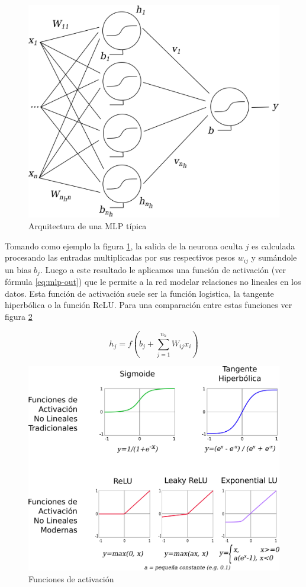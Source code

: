 \begin{figure}[htbp]
	\centering
	\includegraphics[width=0.6\linewidth]{graficos/propios/mlp.png}
	\caption{Arquitectura de una MLP típica \citep{bouzgou2012advanced}}
	\label{fig:mlp-eg}
\end{figure}

Tomando como ejemplo la figura \ref{fig:mlp-eg}, la salida de la neurona oculta $j$ es calculada procesando las entradas multiplicadas por sus respectivos pesos $w_{ij}$ y sumándole un bias $b_j$. Luego a este resultado le aplicamos una función de activación (ver fórmula \ref{eq:mlp-out}) que le permite a la red modelar relaciones no lineales en los datos. Esta función de activación suele ser la función logistica, la tangente hiperbólica o la función \ac{ReLU}. Para una comparación entre estas funciones ver figura \ref{fig:mlp-activation}

\begin{equation}
	\label{eq:mlp-out}
	h_j = f(b_j + \sum_{j=1}^{n_h} W_{ij} x_i)
\end{equation}

\begin{figure}[htbp]
	\centering
	\includegraphics[width=0.8\linewidth]{graficos/propios/funciones_de_activacion.png}
	\caption{Funciones de activación \citep{sze2017efficient}}
	\label{fig:mlp-activation}
\end{figure}

